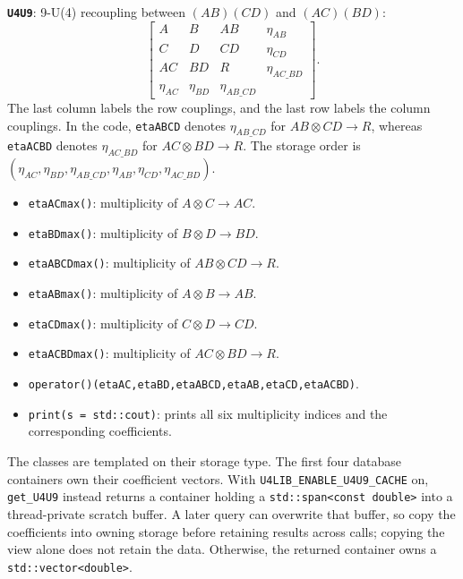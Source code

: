 \documentclass[aps,onecolumn,10pt,superscriptaddress,floatfix,nofootinbib]{revtex4}
\begin{document}
\textbf{\texttt{U4U9}}: 9-U(4) recoupling between $(AB)(CD)$ and $(AC)(BD)$:
\begin{equation}
 \left[\begin{array}{cccc}
 A & B & AB & \eta_{AB} \\
 C & D & CD & \eta_{CD} \\
 AC & BD & R & \eta_{AC\_BD} \\
 \eta_{AC} & \eta_{BD} & \eta_{AB\_CD} &
 \end{array}\right].
\end{equation}
The last column labels the row couplings, and the last row labels the column
couplings. In the code, \verb|etaABCD| denotes $\eta_{AB\_CD}$ for
$AB\otimes CD\to R$, whereas \verb|etaACBD| denotes $\eta_{AC\_BD}$ for
$AC\otimes BD\to R$. The storage order is
$(\eta_{AC},\eta_{BD},\eta_{AB\_CD},\eta_{AB},\eta_{CD},\eta_{AC\_BD})$.
\begin{itemize}
    \item \verb|etaACmax()|: multiplicity of $A\otimes C\to AC$.
    \item \verb|etaBDmax()|: multiplicity of $B\otimes D\to BD$.
    \item \verb|etaABCDmax()|: multiplicity of $AB\otimes CD\to R$.
    \item \verb|etaABmax()|: multiplicity of $A\otimes B\to AB$.
    \item \verb|etaCDmax()|: multiplicity of $C\otimes D\to CD$.
    \item \verb|etaACBDmax()|: multiplicity of $AC\otimes BD\to R$.
    \item \verb|operator()(etaAC,etaBD,etaABCD,etaAB,etaCD,etaACBD)|.
    \item \verb|print(s = std::cout)|: prints all six multiplicity indices
    and the corresponding coefficients.
\end{itemize}

The classes are templated on their storage type. The first four database
containers own their coefficient vectors. With \verb|U4LIB_ENABLE_U4U9_CACHE| on,
\verb|get_U4U9| instead returns a container holding a
\verb|std::span<const double>| into a thread-private scratch buffer. A later
query can overwrite that buffer, so copy the coefficients into owning storage
before retaining results across calls; copying the view alone does not retain
the data. Otherwise, the returned container owns a
\verb|std::vector<double>|.
\end{document}
